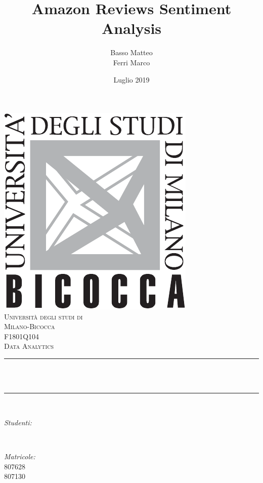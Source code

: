 \documentclass[hidelinks, 12pt]{article}
\title{Amazon Reviews Sentiment Analysis}				%
\author{Basso Matteo \\ Ferri Marco}								%
\date{Luglio 2019}				%
\makeatletter
\let\thetitle\@title
\let\theauthor\@author
\let\thedate\@date
\makeatother
\begin{document}
	

\begin{titlepage}
	\centering
	\vspace*{0.5 cm}
	\includegraphics[scale = 0.75]{images/LogoBicocca.pdf}\\[1.0 cm]	%
	\textsc{\LARGE Università degli studi di}\\[0.2 cm]
	\textsc{\LARGE Milano-Bicocca}\\[2.0 cm]	%
	\textsc{\Large F1801Q104}\\[0.5 cm]				%
	\textsc{\large Data Analytics}				%
	\rule{\linewidth}{0.2 mm} \\[0.4 cm]
	{ \huge \bfseries \thetitle}\\
	\rule{\linewidth}{0.2 mm} \\[1.5 cm]
	
	\begin{minipage}{0.4\textwidth}
		\begin{flushleft} \large
			\emph{Studenti:}\\
			\theauthor
		\end{flushleft}
	\end{minipage}~
	\begin{minipage}{0.4\textwidth}
		\begin{flushright} \large
			\emph{Matricole:} \\
			807628 \\ 807130
		\end{flushright}
	\end{minipage}\\[2 cm]
	
	{\large \thedate}\\[2 cm]
	
	\vfill
	
\end{titlepage}
\end{document}
